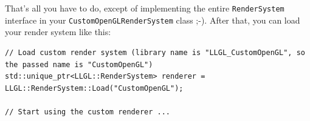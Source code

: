 \documentclass{article}
\begin{document}
That's all you have to do, except of implementing the entire \texttt{RenderSystem} interface
in your \texttt{CustomOpenGLRenderSystem} class ;-).
After that, you can load your render system like this:
\begin{lstlisting}
// Load custom render system (library name is "LLGL_CustomOpenGL", so the passed name is "CustomOpenGL")
std::unique_ptr<LLGL::RenderSystem> renderer = LLGL::RenderSystem::Load("CustomOpenGL");

// Start using the custom renderer ...
\end{lstlisting}





\end{document}
